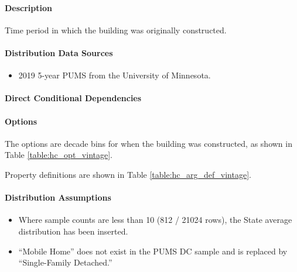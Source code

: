 \paragraph{Description}
% 
Time period in which the building was originally constructed.

\paragraph{Distribution Data Sources}
% 
\begin{itemize}
    \item 2019 5-year PUMS from the University of Minnesota.
\end{itemize}

\paragraph{Direct Conditional Dependencies}


\paragraph{Options}
The options are decade bins for when the building was constructed, as shown in Table \ref{table:hc_opt_vintage}.



Property definitions are shown in Table \ref{table:hc_arg_def_vintage}.



\paragraph{Distribution Assumptions}
% 
\begin{itemize}
    \item Where sample counts are less than 10 (812 / 21024 rows), the State average distribution has been inserted.
    \item ``Mobile Home'' does not exist in the PUMS DC sample and is replaced by ``Single-Family Detached.''
\end{itemize}
